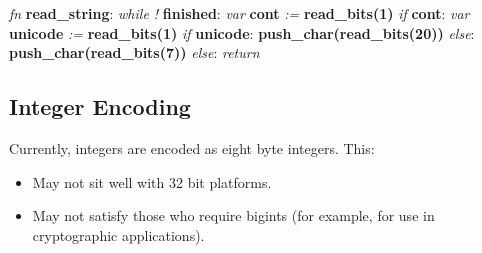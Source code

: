 \begin{changemargin}{-60mm}{0mm}
\begin{myquote}

\vbox{
\textit{fn} \textbf{read\_string}: \newline
\indent\hspace{.5cm} \textit{while !} \textbf{finished}: \newline
\indent\hspace{1cm} \textit{var} \textbf{cont} \textit{:=} \textbf{read\_bits(1)} \newline
\indent\hspace{1cm} \textit{if} \textbf{cont}: \newline
\indent\hspace{1.5cm} \textit{var} \textbf{unicode} \textit{:=} \textbf{read\_bits(1)} \newline
\indent\hspace{1.5cm} \textit{if} \textbf{unicode}: \newline
\indent\hspace{2cm} \textbf{push\_char(read\_bits(20))} \newline
\indent\hspace{1.5cm} \textit{else}: \newline
\indent\hspace{2cm} \textbf{push\_char(read\_bits(7))} \newline
\indent\hspace{1cm} \textit{else}: \newline
\indent\hspace{1.5cm} \textit{return} \newline
}

\end{myquote}
\end{changemargin}

\subsection{Integer Encoding}

Currently, integers are encoded as eight byte integers. This:

\begin{itemize}
\item May not sit well with 32 bit platforms.
\item May not satisfy those who require bigints (for example, for use in
      cryptographic applications).
\end{itemize}

